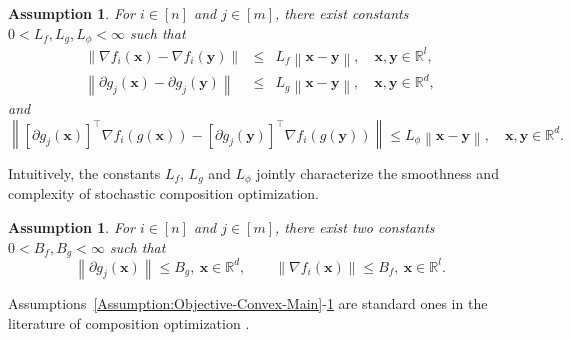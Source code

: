 \documentclass[11pt]{article}
\newtheorem{assumption}[theorem]{Assumption}
\newcommand{\x}{\mathbf x}
\newcommand{\y}{\mathbf y}
\newcommand{\br}{\mathbb{R}}
\begin{document}
\begin{assumption}\label{Assumption:Smooth-Gradient-Jacobian-Main}
For $i\in[n]$ and $j\in[m]$, there exist constants $0<L_f, L_g, L_{\phi}<\infty$ such that
\begin{eqnarray*}
\left\| \nabla f_i(\x) - \nabla f_i(\y)\right\| & \leq & L_f \left\|\x-\y\right\|, \quad \x, \y \in \br^l, \\
\left\| \partial g_j(\x) - \partial g_j(\y)\right\| & \leq & L_g \left\|\x-\y\right\|, \quad \x, \y \in \br^d,
\end{eqnarray*}
and
\begin{equation*}
\left\| \left[\partial g_j(\x)\right]^\top \nabla f_i(g(\x))- \left[\partial g_j(\y)\right]^\top \nabla f_i(g(\y))\right\| \leq L_{\phi}\left\|\x-\y\right\|, \quad \x, \y \in \br^d. 
\end{equation*}
\end{assumption}
Intuitively, the constants $L_f$, $L_g$ and $L_\phi$ jointly characterize the smoothness and complexity of stochastic composition optimization. 
\begin{assumption}\label{Assumption:Bound-Jacobian-Gradient-Main}
For $i\in[n]$ and $j\in[m]$, there exist two constants $0 < B_f, B_g < \infty$ such that
\begin{equation*}
\left\| \partial g_j(\x) \right\| \leq B_g, \ \x\in\br^d, \qquad \left\| \nabla f_i(\x) \right\| \leq B_f, \ \x \in \br^l. 
\end{equation*}
\end{assumption}
Assumptions~\ref{Assumption:Objective-Convex-Main}-\ref{Assumption:Bound-Jacobian-Gradient-Main} are standard ones in the literature of composition optimization \cite{Lian-2017-Finite, Yu-2017-Fast, Huo-2017-Accelerated}.  
\end{document}

